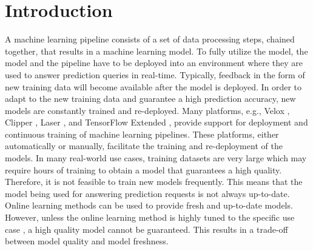 \section{Introduction} \label{introduction}
A machine learning pipeline consists of a set of data processing steps, chained together, that results in a machine learning model.
To fully utilize the model,  the model and the pipeline have to be deployed into an environment where they are used to answer prediction queries in real-time.
Typically, feedback in the form of new training data will become available after the model is deployed.
In order to adapt to the new training data and guarantee a high prediction accuracy, new models are constantly trained and re-deployed.
Many platforms, e.g., Velox \cite{crankshaw2014missing}, Clipper \cite{crankshaw2016clipper}, Laser \cite{agarwal2014laser}, and TensorFlow Extended \cite{baylor2017tfx}, provide support for deployment and continuous training of machine learning pipelines. 
These platforms, either automatically or manually, facilitate the training and re-deployment of the models.
In many real-world use cases, training datasets are very large which may require hours of training to obtain a model that guarantees a high quality.
Therefore, it is not feasible to train new models frequently.
This means that the model being used for answering prediction requests is not always up-to-date.
Online learning methods can be used to provide fresh and up-to-date models.
However, unless the online learning method is highly tuned to the specific use case \cite{ma2009identifying}, a high quality model cannot be guaranteed.
This results in a trade-off between model quality and model freshness.

